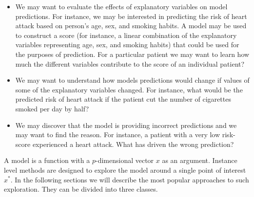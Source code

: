 \documentclass[12pt,]{krantz}
\providecommand{\tightlist}{%
  \setlength{\itemsep}{0pt}\setlength{\parskip}{0pt}}
\begin{document}
\begin{itemize}
\tightlist
\item
  We may want to evaluate the effects of explanatory variables on model predictions. For instance, we may be interested in predicting the risk of heart attack based on person's age, sex, and smoking habits. A model may be used to construct a score (for instance, a linear combination of the explanatory variables representing age, sex, and smoking habits) that could be used for the purposes of prediction. For a particular patient we may want to learn how much the different variables contribute to the score of an individual patient?
\item
  We may want to understand how models predictions would change if values of some of the explanatory variables changed. For instance, what would be the predicted risk of heart attack if the patient cut the number of cigarettes smoked per day by half?
\item
  We may discover that the model is providing incorrect predictions and we may want to find the reason. For instance, a patient with a very low risk-score experienced a heart attack. What has driven the wrong prediction?
\end{itemize}

A model is a function with a \(p\)-dimensional vector \(x\) as an argument. Instance level methods are designed to explore the model around a single point of interest \(x^*\). In the following sections we will describe the most popular approaches to such exploration. They can be divided into three classes.
\end{document}
